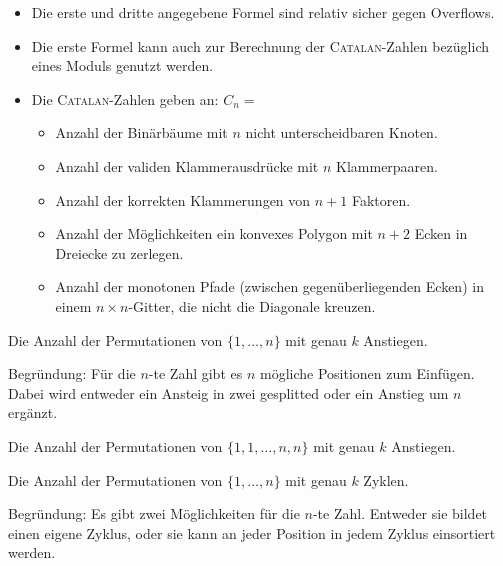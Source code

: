 \begin{bem}
	\begin{itemize}[nosep]
		\item Die erste und dritte angegebene Formel sind relativ sicher gegen Overflows.
		\item Die erste Formel kann auch zur Berechnung der \textsc{Catalan}-Zahlen
		bezüglich eines Moduls genutzt werden.
		\item Die \textsc{Catalan}-Zahlen geben an: $C_n =$
		\begin{itemize}[nosep]
			\item Anzahl der Binärbäume mit $n$ nicht unterscheidbaren Knoten.
			\item Anzahl der validen Klammerausdrücke mit $n$ Klammerpaaren.
			\item Anzahl der korrekten Klammerungen von $n+1$ Faktoren.
			\item Anzahl der Möglichkeiten ein konvexes Polygon mit $n + 2$ Ecken in
			Dreiecke zu zerlegen.
			\item Anzahl der monotonen Pfade (zwischen gegenüberliegenden Ecken) in
			einem $n \times n$-Gitter, die nicht die Diagonale kreuzen.
		\end{itemize}
	\end{itemize}
\end{bem}

\begin{bem}
	Die Anzahl der Permutationen von $\{1, \ldots, n\}$ mit genau $k$ Anstiegen.

	Begründung: Für die $n$-te Zahl gibt es $n$ mögliche Positionen zum Einfügen.
	Dabei wird entweder ein Ansteig in zwei gesplitted oder ein Anstieg um $n$ ergänzt.
	\end{bem}

\begin{bem}
	Die Anzahl der Permutationen von $\{1,1, \ldots, n,n\}$ mit genau $k$ Anstiegen.
\end{bem}

\begin{bem}
	Die Anzahl der Permutationen von $\{1, \ldots, n\}$ mit genau $k$ Zyklen.

	Begründung: Es gibt zwei Möglichkeiten für die $n$-te Zahl. Entweder sie
	bildet einen eigene Zyklus, oder sie kann an jeder Position in jedem Zyklus
	einsortiert werden.
\end{bem}

